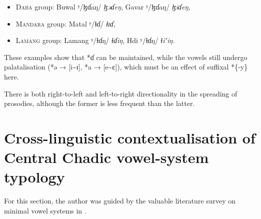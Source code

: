 \documentclass[output=paper]{langscibook}
\begin{document}
\begin{itemize}
\item \textsc{Daba} group: Buwal ʸ/ɮɗaŋ/ \textit{ɮəɗeŋ}, Gavar ʸ/ɮɗaŋ/ \textit{ɮiɗeŋ,}
\item \textsc{Mandara} group: Matal ʸ/ɬɗ/  \textit{ɬɪɗ,}
\item \textsc{Lamang} group: Lamang ʸ/ɬɗŋ/ \textit{ɬɗiŋ}, Hdi ʸ/ɬɗŋ/ \textit{ɬiʼiŋ.}
\end{itemize}

These examples show that *ɗ can be maintained, while the vowels still undergo palatalisation (*ə → [i{\textasciitilde}ɪ], *a → [e{\textasciitilde}ε]), which must be an effect of suffixal *\{-y\} here.

There is both right-to-left and left-to-right directionality in the spreading of prosodies, although the former is less frequent than the latter.

\section{Cross-linguistic contextualisation of Central Chadic vowel-system typology}
\label{sec:Wolff:3}
For this section, the author was guided by the valuable literature survey on minimal vowel systems in \citet[59-117]{Anderson2016}. 
\end{document}
